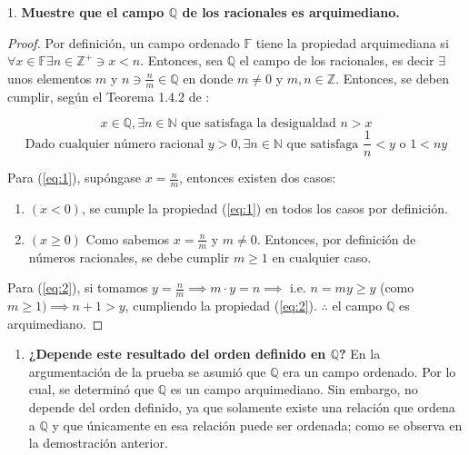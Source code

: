 \documentclass[a4paper,12pt]{article}
\begin{document}
1.\textbf{ Muestre que el campo $\mathbb{Q}$ de los racionales es arquimediano.} 
\begin{proof}
Por definición, un campo ordenado $\mathbb{F}$ tiene la propiedad arquimediana si $\forall x\in\mathbb{F}\exists n\in\mathbb{Z}^+\ni x<n$. Entonces, sea $\mathbb{Q}$ el campo de los racionales, es decir $\exists$ unos elementos $m$ y $n\ni \frac{n}{m}\in \mathbb{Q}$ en donde $ m\neq 0$ y $m,n\in \mathbb{Z}$. Entonces, se deben cumplir, según el Teorema 1.4.2 de \cite{abbott2012understanding}: 

\begin{equation}\label{eq:1}
x\in \mathbb{Q}, \exists n\in\mathbb{N} \text{ que satisfaga la desigualdad } n>x    
\end{equation}
\begin{equation}\label{eq:2}
    \text{Dado cualquier número racional } y>0, \exists n\in\mathbb{N} \text{ que satisfaga } \frac{1}{n}<y  \text{ o }1<ny
\end{equation}

Para (\ref{eq:1}), supóngase $x=\frac{n}{m}$, entonces existen dos casos: \begin{enumerate}
    \item $(x<0)$, se cumple la propiedad (\ref{eq:1}) en todos los casos por definición.
    \item $(x\geq 0)$ Como sabemos $x=\frac{n}{m}$ y $m\neq 0$. Entonces, por definición de números racionales, se debe cumplir $m\geq 1$ en cualquier caso.
\end{enumerate}
Para (\ref{eq:2}), si tomamos $y=\frac{n}{m}\implies m\cdot y=n\implies $ i.e. $n=my\geq y$ (como $m\geq 1)\implies n+1>y$, cumpliendo la propiedad (\ref{eq:2}).\newline \newline
$\therefore$ el campo $\mathbb{Q}$ es arquimediano.
\end{proof}
\begin{enumerate}
    \item \textbf{¿Depende este resultado del orden definido en $\mathbb{Q}$?} \newline \newline 
    En la argumentación de la prueba se asumió que $\mathbb{Q}$ era un campo ordenado. Por lo cual, se determinó que $\mathbb{Q}$ es un campo arquimediano. Sin embargo, no depende del orden definido, ya que solamente existe una relación que ordena a $\mathbb{Q}$ y que únicamente en esa relación puede ser ordenada; como se observa en la demostración anterior.
 \end{enumerate}
\end{document}
